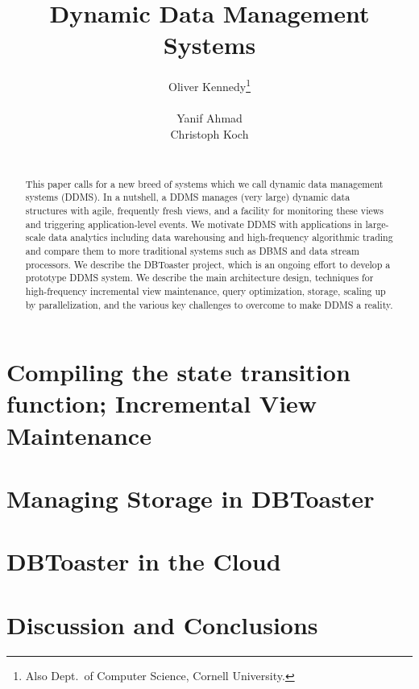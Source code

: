 \documentclass{sig-alternate}
\begin{document}
\title{Dynamic Data Management Systems}
\author{
\alignauthor
Oliver Kennedy\thanks{Also Dept.\ of Computer Science, Cornell University.}\\
     \\
\alignauthor
Yanif Ahmad\\
\alignauthor
Christoph Koch\\
     \\
}
\maketitle

\begin{abstract}
This paper calls for a new breed of systems which
we call dynamic data management systems (DDMS). In a nutshell,
a DDMS manages (very large) dynamic data structures with 
agile, frequently fresh views, and a facility for monitoring
these views and triggering application-level events.
%
We motivate DDMS with applications in large-scale data analytics
including data warehousing and high-frequency algorithmic trading
and compare them to more traditional systems such as DBMS and
data stream processors.
%
We describe the DBToaster project, which is an ongoing effort to
develop a prototype DDMS system. We describe the main architecture
design, techniques for high-frequency incremental view maintenance,
query optimization, storage, scaling up by parallelization, and
the various key challenges to overcome to make DDMS a reality.
\end{abstract}






\section{Compiling the state transition function; Incremental View Maintenance}




\section{Managing Storage in DBToaster}
\label{sec:storage}


\section{DBToaster in the Cloud}
\label{sec:distribution}


\section{Discussion and Conclusions}



\end{document}
